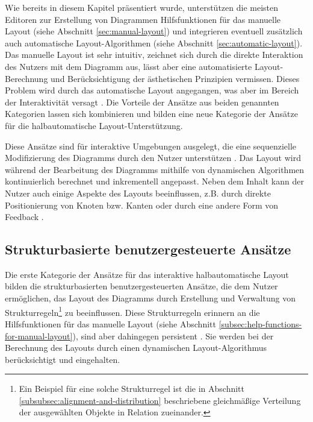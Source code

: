 Wie bereits in diesem Kapitel präsentiert wurde, unterstützen die meisten Editoren zur Erstellung von Diagrammen Hilfsfunktionen für das manuelle Layout (siehe Abschnitt \ref{sec:manual-layout}) und integrieren eventuell zusätzlich auch automatische Layout-Algorithmen (siehe Abschnitt \ref{sec:automatic-layout}). Das manuelle Layout ist sehr intuitiv, zeichnet sich durch die direkte Interaktion des Nutzers mit dem Diagramm aus, lässt aber eine automatisierte Layout-Berechnung und Berücksichtigung der ästhetischen Prinzipien vermissen. Dieses Problem wird durch das automatische Layout angegangen, was aber im Bereich der Interaktivität versagt \cite{GladischSchumann14Semi-Automatic}. Die Vorteile der Ansätze aus beiden genannten Kategorien lassen sich kombinieren und bilden eine neue Kategorie der Ansätze für die halbautomatische Layout-Unterstützung.

Diese Ansätze sind für interaktive Umgebungen ausgelegt, die eine sequenzielle Modifizierung des Diagramms durch den Nutzer unterstützen \cite{Arvo02Techniques, GladischSchumann14Semi-Automatic, Wybrow08Using}. Das Layout wird während der Bearbeitung des Diagramms mithilfe von dynamischen Algorithmen kontinuierlich berechnet und inkrementell angepasst. Neben dem Inhalt kann der Nutzer auch einige Aspekte des Layouts beeinflussen, z.B. durch direkte Positionierung von Knoten bzw. Kanten oder durch eine andere Form von Feedback \cite{Arvo02Techniques}.

\subsection{Strukturbasierte benutzergesteuerte Ansätze}
\label{subsec:structure-based-user-controlled-approaches}

Die erste Kategorie der Ansätze für das interaktive halbautomatische Layout bilden die strukturbasierten benutzergesteuerten Ansätze, die dem Nutzer ermöglichen, das Layout des Diagramms durch Erstellung und Verwaltung von Strukturregeln\footnote{Ein Beispiel für eine solche Strukturregel ist die in Abschnitt \ref{subsubsec:alignment-and-distribution} beschriebene gleichmäßige Verteilung der ausgewählten Objekte in Relation zueinander.} zu beeinflussen. Diese Strukturregeln erinnern an die Hilfsfunktionen für das manuelle Layout (siehe Abschnitt \ref{subsec:help-functions-for-manual-layout}), sind aber dahingegen persistent \cite{Wybrow08Using}. Sie werden bei der Berechnung des Layouts durch einen dynamischen Layout-Algorithmus berücksichtigt und eingehalten.

